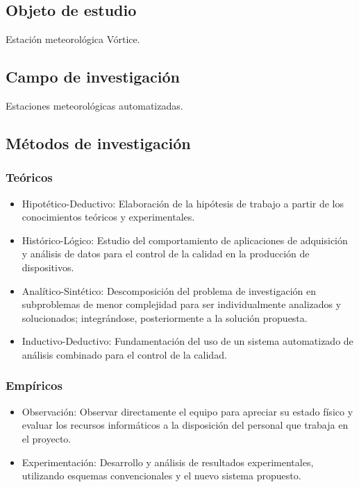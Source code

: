 \documentclass[12pt,letterpaper]{article}
\begin{document}
\begin{sloppypar}
        \subsection{Objeto de estudio}\label{subsec:objeto-de-estudio}
        Estación meteorológica Vórtice.

        \subsection{Campo de investigación}\label{subsec:campo-de-investigacion}
        Estaciones meteorológicas automatizadas.

        \subsection{Métodos de
        investigación}\label{subsec:metodos-de-investigacion}

        \subsubsection{Teóricos}
        \begin{itemize}
            \item Hipotético-Deductivo: Elaboración de la hipótesis de
            trabajo a partir de los
            conocimientos teóricos y experimentales.
            \item Histórico-Lógico: Estudio del comportamiento de
            aplicaciones de adquisición y
            análisis de datos para el control de la calidad en la producción de
            dispositivos.
            \item Analítico-Sintético: Descomposición del problema de
            investigación en
            subproblemas de menor complejidad para ser individualmente
            analizados y
            solucionados;
            integrándose, posteriormente a la solución propuesta.
            \item Inductivo-Deductivo: Fundamentación del uso de un sistema
            automatizado de
            análisis combinado para el control de la calidad.
        \end{itemize}

        \subsubsection{Empíricos}
        \begin{itemize}
            \item Observación: Observar directamente el equipo para apreciar
            su estado físico y
            evaluar los recursos informáticos a la disposición del personal
            que trabaja en
            el proyecto.
            \item Experimentación: Desarrollo y análisis de resultados
            experimentales, utilizando
            esquemas convencionales y el nuevo sistema propuesto.
        \end{itemize}


\end{sloppypar}
\end{document}

